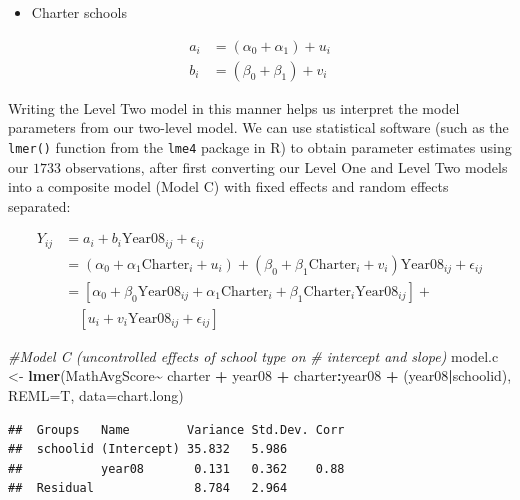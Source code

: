 \documentclass[
]{krantz}
\newenvironment{Shaded}{\begin{snugshade}}{\end{snugshade}}
\newcommand{\AttributeTok}[1]{\textcolor[rgb]{0.27,0.27,0.27}{#1}}
\newcommand{\CommentTok}[1]{\textcolor[rgb]{0.37,0.37,0.37}{\textit{#1}}}
\newcommand{\FunctionTok}[1]{\textcolor[rgb]{0.27,0.27,0.27}{\textbf{#1}}}
\newcommand{\NormalTok}[1]{#1}
\newcommand{\OtherTok}[1]{\textcolor[rgb]{0.37,0.37,0.37}{#1}}
\newcommand{\SpecialCharTok}[1]{\textcolor[rgb]{0.43,0.43,0.43}{\textbf{#1}}}
\providecommand{\tightlist}{%
  \setlength{\itemsep}{0pt}\setlength{\parskip}{0pt}}
\begin{document}
\begin{itemize}
\tightlist
\item
  Charter schools
\end{itemize}

\begin{align*}
a_{i} & = (\alpha_{0} + \alpha_{1}) + u_{i}\\
b_{i} & = (\beta_{0}+ \beta_{1}) + v_{i}
\end{align*}

Writing the Level Two model in this manner helps us interpret the model parameters from our two-level model. We can use statistical software (such as the \texttt{lmer()} function from the \texttt{lme4} package in R) to obtain parameter estimates using our \(1733\) observations, after first converting our Level One and Level Two models into a composite model (Model C) with fixed effects and random effects separated:

\begin{align*}
Y_{ij} & = a_{i} + b_{i}\textrm{Year08}_{ij}+ \epsilon_{ij} \\
       & = (\alpha_{0} + \alpha_{1}\textrm{Charter}_i +u_{i}) + (\beta_{0} + \beta_{1}\textrm{Charter}_i + v_{i})\textrm{Year08}_{ij} + \epsilon_{ij} \\
       & = [\alpha_{0} + \beta_{0}\textrm{Year08}_{ij} +\alpha_{1}\textrm{Charter}_i+ \beta_{1}\textrm{Charter}_i\textrm{Year08}_{ij}] + \\
       & \quad [u_{i} + v_{i}\textrm{Year08}_{ij} + \epsilon_{ij}]
\end{align*}

\begin{Shaded}
\begin{Highlighting}[]
\CommentTok{\#Model C (uncontrolled effects of school type on }
\CommentTok{\#   intercept and slope)}
\NormalTok{model.c }\OtherTok{\textless{}{-}} \FunctionTok{lmer}\NormalTok{(MathAvgScore}\SpecialCharTok{\textasciitilde{}}\NormalTok{ charter }\SpecialCharTok{+}\NormalTok{ year08 }\SpecialCharTok{+} 
\NormalTok{  charter}\SpecialCharTok{:}\NormalTok{year08 }\SpecialCharTok{+}\NormalTok{ (year08}\SpecialCharTok{|}\NormalTok{schoolid), }
  \AttributeTok{REML=}\NormalTok{T, }\AttributeTok{data=}\NormalTok{chart.long)}
\end{Highlighting}
\end{Shaded}

\begin{verbatim}
##  Groups   Name        Variance Std.Dev. Corr
##  schoolid (Intercept) 35.832   5.986        
##           year08       0.131   0.362    0.88
##  Residual              8.784   2.964
\end{verbatim}
\end{document}
